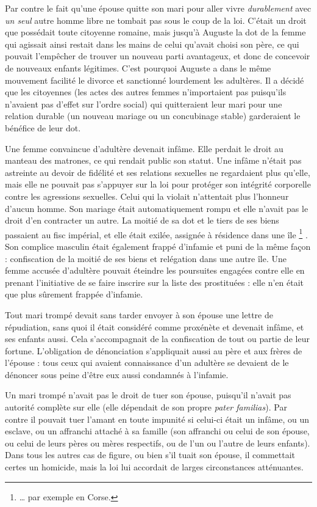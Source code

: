  Par contre le fait qu'une épouse quitte son mari pour aller vivre \emph{durablement} avec \emph{un seul} autre homme libre ne tombait pas sous le coup de la loi. C'était un droit que possédait toute citoyenne romaine, mais jusqu'à Auguste la dot de la femme qui agissait ainsi restait dans les mains de celui qu'avait choisi son père, ce qui pouvait l'empêcher de trouver un nouveau parti avantageux, et donc de concevoir de nouveaux enfants légitimes. C'est pourquoi Auguste a dans le même mouvement facilité le divorce et sanctionné lourdement les adultères. Il a décidé que les citoyennes (les actes des autres femmes n'importaient pas puisqu'ils n'avaient pas d'effet sur l'ordre social) qui quitteraient leur mari pour une relation durable (un nouveau mariage ou un concubinage stable) garderaient le bénéfice de leur dot. 

 Une femme convaincue d'adultère devenait infâme. Elle perdait le droit au manteau des matrones, ce qui rendait public son statut. Une infâme n'était pas astreinte au devoir de fidélité et ses relations sexuelles ne regardaient plus qu'elle, mais elle ne pouvait pas s'appuyer sur la loi pour protéger son intégrité corporelle contre les agressions sexuelles. Celui qui la violait n'attentait plus l'honneur d'aucun homme. Son mariage était automatiquement rompu et elle n'avait pas le droit d'en contracter un autre. La moitié de sa dot et le tiers de ses biens passaient au fisc impérial, et elle était exilée, assignée à résidence dans une île%
\footnote{… par exemple en Corse.}%
. Son complice masculin était également frappé d'infamie et puni de la même façon : confiscation de la moitié de ses biens et relégation dans une autre île. Une femme accusée d'adultère pouvait éteindre les poursuites engagées contre elle en prenant l'initiative de se faire inscrire sur la liste des prostituées : elle n'en était que plus sûrement frappée d'infamie. 

 Tout mari trompé devait sans tarder envoyer à son épouse une lettre de répudiation, sans quoi il était considéré comme proxénète et devenait infâme, et ses enfants aussi. Cela s'accompagnait de la confiscation de tout ou partie de leur fortune. L'obligation de dénonciation s'appliquait aussi au père et aux frères de l'épouse : tous ceux qui avaient connaissance d'un adultère se devaient de le dénoncer sous peine d'être eux aussi condamnés à l'infamie.

 Un mari trompé n'avait pas le droit de tuer son épouse, puisqu'il n'avait pas autorité complète sur elle (elle dépendait de son propre \emph{pater familias}). Par contre il pouvait tuer l'amant en toute impunité si celui-ci était un infâme, ou un esclave, ou un affranchi attaché à sa famille (son affranchi ou celui de son épouse, ou celui de leurs pères ou mères respectifs, ou de l'un ou l'autre de leurs enfants). Dans tous les autres cas de figure, ou bien s'il tuait son épouse, il commettait certes un homicide, mais la loi lui accordait de larges circonstances atténuantes. 

